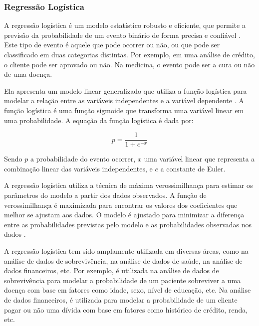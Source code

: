 \subsubsection{Regressão Logística}

A regressão logística é um modelo estatístico robusto e eficiente, que permite a previsão da probabilidade de um evento binário de forma precisa e confiável \citep{hosmer2013applied}. Este tipo de evento é aquele que pode ocorrer ou não, ou que pode ser classificado em duas categorias distintas. Por exemplo, em uma análise de crédito, o cliente pode ser aprovado ou não. Na medicina, o evento pode ser a cura ou não de uma doença.

Ela apresenta um modelo linear generalizado que utiliza a função logística para modelar a relação entre as variáveis independentes e a variável dependente \citep{kleinbaum2010logistic}. A função logística é uma função sigmoide que transforma uma variável linear em uma probabilidade. A equação da função logística é dada por:

\begin{equation}
    p = \frac{1}{1 + e^{-x}}
\end{equation}

Sendo $p$ a probabilidade do evento ocorrer, $x$ uma variável linear que representa a combinação linear das variáveis independentes, e $e$ a constante de Euler.

A regressão logística utiliza a técnica de máxima verossimilhança para estimar os parâmetros do modelo a partir dos dados observados. A função de verossimilhança é maximizada para encontrar os valores dos coeficientes que melhor se ajustam aos dados. O modelo é ajustado para minimizar a diferença entre as probabilidades previstas pelo modelo e as probabilidades observadas nos dados \citep{mccullagh1989generalized}.

A regressão logística tem sido amplamente utilizada em diversas áreas, como na análise de dados de sobrevivência, na análise de dados de saúde, na análise de dados financeiros, etc. Por exemplo, é utilizada na análise de dados de sobrevivência para modelar a probabilidade de um paciente sobreviver a uma doença com base em fatores como idade, sexo, nível de educação, etc. Na análise de dados financeiros, é utilizada para modelar a probabilidade de um cliente pagar ou não uma dívida com base em fatores como histórico de crédito, renda, etc.


